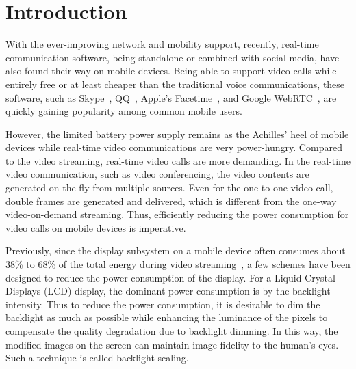 \section{Introduction}

With the ever-improving network and mobility support, recently,
real-time communication software, being standalone or combined with
social media, have also found their way on mobile devices.  Being able
to support video calls while entirely free or at least cheaper than
the traditional voice communications, these software, such as
Skype~\cite{skype}, QQ~\cite{qq}, Apple's Facetime~\cite{facetime},
and Google WebRTC~\cite{webrtcproject}, are quickly gaining popularity
among common mobile users.

However, the limited battery power supply remains as the Achilles'
heel of mobile devices while real-time video communications are very
power-hungry. Compared to the video streaming, real-time video calls
are more demanding. In the real-time video communication, such as 
video conferencing, the video contents are generated on the fly from
multiple sources. Even for the one-to-one video call, double frames
are generated and delivered, which is different from the one-way video-on-demand streaming. Thus, efficiently
reducing the power consumption for video calls on mobile devices is
imperative.

Previously, since the display subsystem on a mobile device often
consumes about 38\% to 68\% of the total energy during video
streaming~\cite{AG10}, a few schemes have been designed to reduce the
power consumption of the display. For a Liquid-Crystal Displays (LCD)
display, the dominant power consumption is by the backlight
intensity. Thus to reduce the power consumption, it is desirable to
dim the backlight as much as possible while enhancing the luminance of
the pixels to compensate the quality degradation due to backlight
dimming.  In this way, the modified images on the screen can maintain
image fidelity to the human's eyes. Such a technique is called
backlight scaling.

